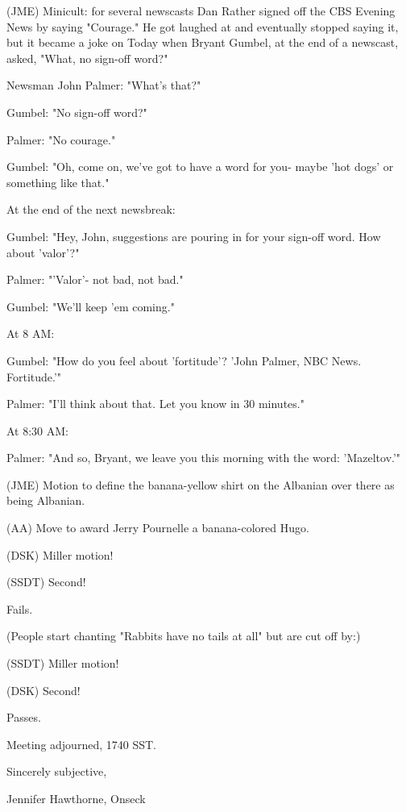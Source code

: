 \documentclass[12pt]{article}
\begin{document}
(JME) Minicult: for several newscasts Dan Rather signed off the CBS Evening News by saying "Courage." He got laughed at and eventually stopped saying it, but it became a joke on Today when Bryant Gumbel, at the end of a newscast, asked, "What, no sign-off word?"

Newsman John Palmer: "What's that?"

Gumbel: "No sign-off word?"

Palmer: "No courage."

Gumbel: "Oh, come on, we've got to have a word for you- maybe 'hot dogs' or something like that."

At the end of the next newsbreak:

Gumbel: "Hey, John, suggestions are pouring in for your sign-off word. How about 'valor'?"

Palmer: "'Valor'- not bad, not bad."

Gumbel: "We'll keep 'em coming."

At 8 AM:

Gumbel: "How do you feel about 'fortitude'? 'John Palmer, NBC News. Fortitude.'"

Palmer: "I'll think about that. Let you know in 30 minutes."

At 8:30 AM:

Palmer: "And so, Bryant, we leave you this morning with the word: 'Mazeltov.'"

(JME) Motion to define the banana-yellow shirt on the Albanian over there as being Albanian.

(AA) Move to award Jerry Pournelle a banana-colored Hugo.

(DSK) Miller motion!

(SSDT) Second!

Fails.

(People start chanting "Rabbits have no tails at all" but are cut off by:)

(SSDT) Miller motion!

(DSK) Second!

Passes.

\vspace{12pt}

\noindent
Meeting adjourned, 1740 SST.

\vspace{18pt}

\centerline{Sincerely subjective,}
\centerline{Jennifer Hawthorne, Onseck}
\end{document}
